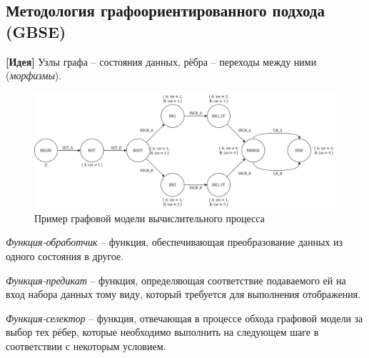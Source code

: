 \subsection{Методология графоориентированного подхода (GBSE)}
\begin{frame}
  \textbf{[Идея]} Узлы графа -- состояния данных, рёбра -- переходы между ними (\emph{морфизмы}).

  \begin{figure}
    \centering
    \includegraphics[width=\textwidth]{images/adot_example.png}
    \caption{Пример графовой модели вычислительного процесса}\label{fig:aDotExamplePic}
  \end{figure}
\end{frame}

\begin{frame}
  \begin{designation}
    \emph{Функция-обработчик} -- функция, обеспечивающая преобразование данных из одного состояния в другое.    
  \end{designation}
  \begin{designation}
    \emph{Функция-предикат} -- функция, определяющая соответствие подаваемого ей на вход набора данных тому виду, который требуется для выполнения отображения.
  \end{designation}
  \begin{designation}
    \emph{Функция-селектор} -- функция, отвечающая в процессе обхода графовой модели за выбор тех рёбер, которые необходимо выполнить на следующем шаге в соответствии с некоторым условием.    
  \end{designation}
\end{frame}